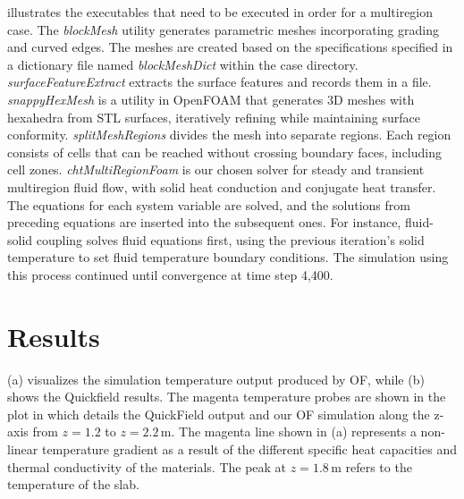 \documentclass[runningheads]{llncs}
\begin{document}
 illustrates the executables that need to be executed in order for a multiregion case.
The \textit{blockMesh} utility generates parametric meshes incorporating grading and curved edges. 
The meshes are created based on the specifications specified in a dictionary file named \textit{blockMeshDict}  within the case directory.
\textit{surfaceFeatureExtract} extracts the surface features and records them in a file.      
\textit{snappyHexMesh} is a utility in OpenFOAM that generates 3D meshes with hexahedra from STL surfaces, iteratively refining while maintaining surface conformity.
\textit{splitMeshRegions} divides the mesh into separate regions. Each region consists of cells that can be reached without crossing boundary faces, including cell zones.
\textit{chtMultiRegionFoam} is our chosen solver for steady and transient multiregion fluid flow, with solid heat conduction and conjugate heat transfer. The equations for each system variable are solved, and the solutions from preceding equations are inserted into the subsequent ones. For instance, fluid-solid coupling solves fluid equations first, using the previous iteration's solid temperature to set fluid temperature boundary conditions. The simulation using this process continued until convergence at time step 4,400.
    
\section{Results} 
 (a) visualizes the simulation temperature output produced by OF, while  (b) shows the Quickfield results. The magenta temperature probes are shown in the plot in  which details the QuickField output and our OF simulation along the z-axis from $z= 1.2$ to $z=2.2\, \text{m}$. The magenta line shown in  (a) represents a non-linear temperature gradient as a result of the different specific heat capacities and thermal conductivity of the materials. The peak at $z=1.8\, \text{m}$ refers to the temperature of the slab. 
\end{document}
